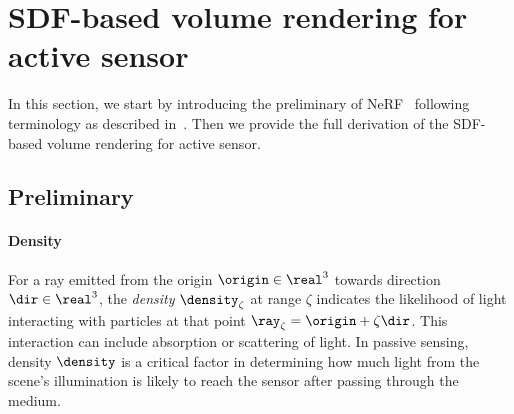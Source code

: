 
\section{SDF-based volume rendering for active sensor}\label{sec:sup_sdf_vol_render}
In this section, we start by introducing the preliminary of NeRF~\cite{mildenhall2020nerf} following terminology as described in~\cite{tagliasacchi2022volume}. Then we provide the full derivation of the SDF-based volume rendering for active sensor. 

\subsection{Preliminary}\label{sec:supp_pre}
\paragraph{Density}
For a ray emitted from the origin $\origin \in \real^3$ towards direction $\dir \in \real^3$, the \textit{density} $\density_\zeta$ at range $\zeta$ indicates the likelihood of light interacting with particles at that point $\ray_\zeta = \origin + \zeta \dir$. This interaction can include absorption or scattering of light. In passive sensing, density $\density$ is a critical factor in determining how much light from the scene's illumination is likely to reach the sensor after passing through the medium.
